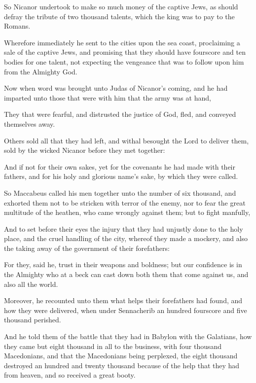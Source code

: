 {\par }{\PP {}So Nicanor undertook to make so much money of the captive Jews, as should defray the tribute of two thousand talents, which the king was to pay to the Romans.
\par }{\PP {}Wherefore immediately he sent to the cities upon the sea coast, proclaiming a sale of the captive Jews, and promising that they should have fourscore and ten bodies for one talent, not expecting the vengeance that was to follow upon him from the Almighty God.
\par }{\PP {}Now when word was brought unto Judas of Nicanor’s coming, and he had imparted unto those that were with him that the army was at hand,
\par }{\PP {}They that were fearful, and distrusted the justice of God, fled, and conveyed themselves away.
\par }{\PP {}Others sold all that they had left, and withal besought the Lord to deliver them, sold by the wicked Nicanor before they met together:
\par }{\PP {}And if not for their own sakes, yet for the covenants he had made with their fathers, and for his holy and glorious name’s sake, by which they were called.
\par }{\PP {}So Maccabeus called his men together unto the number of six thousand, and exhorted them not to be stricken with terror of the enemy, nor to fear the great multitude of the heathen, who came wrongly against them; but to fight manfully,
\par }{\PP {}And to set before their eyes the injury that they had unjustly done to the holy place, and the cruel handling of the city, whereof they made a mockery, and also the taking away of the government of their forefathers:
\par }{\PP {}For they, said he, trust in their weapons and boldness; but our confidence is in the Almighty who at a beck can cast down both them that come against us, and also all the world.
\par }{\PP {}Moreover, he recounted unto them what helps their forefathers had found, and how they were delivered, when under Sennacherib an hundred fourscore and five thousand perished.
\par }{\PP {}And he told them of the battle that they had in Babylon with the Galatians, how they came but eight thousand in all to the business, with four thousand Macedonians, and that the Macedonians being perplexed, the eight thousand destroyed an hundred and twenty thousand because of the help that they had from heaven, and so received a great booty.
}
